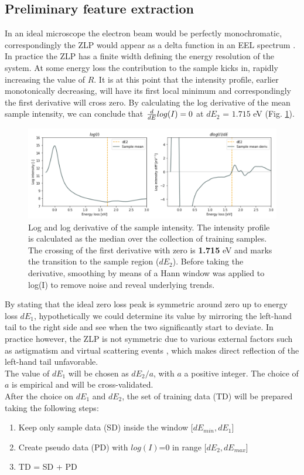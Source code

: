 \documentclass[11pt,a4paper]{article}
\def\frac#1#2{{{#1}\over {#2}}}
\numberwithin{equation}{section}
\numberwithin{figure}{section}
\numberwithin{table}{section}
\begin{document}
\subsection{Preliminary feature extraction}

In an ideal microscope the electron beam would be perfectly monochromatic, correspondingly the ZLP would appear as a delta function in an EEL spectrum \cite{rafferty}. In practice the ZLP has a finite width defining the energy resolution of the system. At some energy loss the contribution to the sample kicks in, rapidly increasing the value of $R$. It is at this point that the intensity profile, earlier monotonically decreasing, will have its first local minimum and correspondingly the first derivative will cross zero. By calculating the log derivative of the mean sample intensity, we can conclude that  $\frac{d}{dE}log(I)=0$ at $dE_2$ = $1.715$ eV  (Fig. \ref{bound}). 

\begin{figure}[H]
    \centering 
    \includegraphics[width=150mm]{plots/bound.png}
    \caption{Log and log derivative of the sample intensity. The intensity profile is calculated as the median over the collection of training samples. The crossing of the first derivative with zero is \textbf{1.715} eV and marks the transition to the sample region ($dE_2$). Before taking the derivative, smoothing by means of a Hann window \cite{hann} was applied to log(I) to remove noise and reveal underlying trends. }
    \label{bound}
\end{figure}

By stating that the ideal zero loss peak is symmetric around zero up to energy loss $dE_1$, hypothetically we could determine its value by mirroring the left-hand tail to the right side and see when the two significantly start to deviate. In practice however, the ZLP is not symmetric due to various external factors such as astigmatism \cite{astigma} and virtual scattering events \cite{rafferty}, which makes direct reflection of the left-hand tail unfavorable. \\
The value of $dE_1$ will be chosen as $dE_2 / a$, with $a$ a positive integer. The choice of $a$ is empirical and will be cross-validated. \\ 
After the choice on $dE_1$ and $dE_2$, the set of training data (TD) will be prepared taking the following steps:
\begin{enumerate}
    \item Keep only sample data (SD) inside the window [$dE_{min}, dE_1$]
    \item Create pseudo data (PD) with $log(I)$=0 in range [$dE_2, dE_{max}$]
    \item TD = SD + PD
\end{enumerate}
\end{document}
